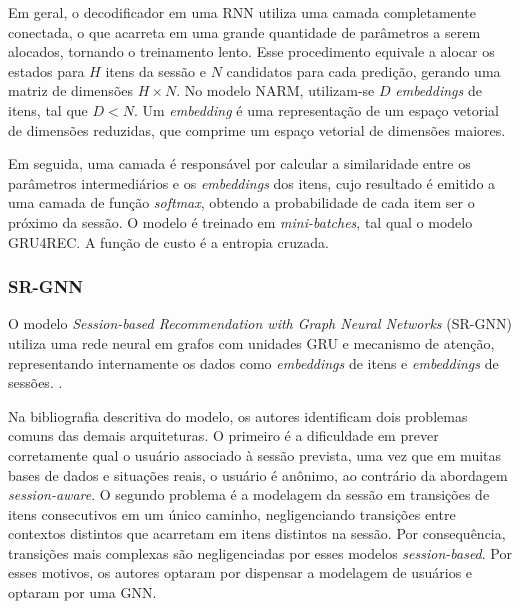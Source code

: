 Em geral, o decodificador em uma RNN utiliza uma camada completamente conectada,
o que acarreta em uma grande quantidade de parâmetros a serem alocados, tornando
o treinamento lento. Esse procedimento equivale a alocar os estados para $H$
itens da sessão e $N$ candidatos para cada predição, gerando uma matriz de
dimensões ${H \times N}$. No modelo NARM, utilizam-se $D$ \textit{embeddings} de
itens, tal que $D < N$. Um \textit{embedding} é uma representação de um espaço
vetorial de dimensões reduzidas, que comprime um espaço vetorial de dimensões
maiores.

Em seguida, uma camada é responsável por calcular a
similaridade entre os parâmetros intermediários e os \textit{embeddings} dos
itens, cujo resultado é emitido a uma camada de função \textit{softmax}, obtendo
a probabilidade de cada item ser o próximo da sessão. O modelo é treinado em \textit{mini-batches}, tal qual o modelo GRU4REC. A
função de custo é a entropia cruzada.


\subsubsection{SR-GNN}
O modelo \textit{Session-based Recommendation with Graph Neural Networks}
(SR-GNN) utiliza uma rede neural em grafos com unidades GRU e mecanismo de
atenção, representando internamente os dados como \textit{embeddings} de itens
e \textit{embeddings} de sessões. \cite{gnn}.

Na bibliografia descritiva do modelo, os autores identificam dois problemas
comuns das demais arquiteturas. O primeiro é a dificuldade em prever
corretamente qual o usuário associado à sessão prevista, uma vez que em muitas
bases de dados e situações reais, o usuário é anônimo, ao contrário da abordagem
\textit{session-aware}. O segundo problema é a modelagem da sessão em transições
de itens consecutivos em um único caminho, negligenciando transições entre
contextos distintos que acarretam em itens distintos na sessão. Por
consequência, transições mais complexas são negligenciadas por esses modelos
\textit{session-based}. Por esses motivos, os autores optaram por dispensar a
modelagem de usuários e optaram por uma GNN.

